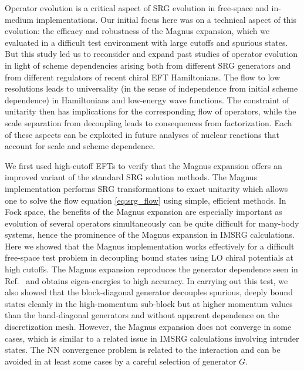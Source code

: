 \documentclass[10pt,aps,prc,floatfix,twocolumn,nofootinbib]{revtex4-1}
\begin{document}
Operator evolution is a critical aspect of SRG evolution in free-space and in-medium implementations.
Our initial focus here was on a technical aspect of this evolution: the efficacy and robustness of the Magnus expansion, which we evaluated in a difficult test environment with large cutoffs and spurious states.
But this study led us to reconsider and expand past studies of operator evolution in light of scheme dependencies arising both from different SRG generators and from different regulators of recent chiral EFT Hamiltonians.
The flow to low resolutions leads to universality (in the sense of independence from initial scheme dependence) in Hamiltonians and low-energy wave functions.
The constraint of unitarity then has implications for the corresponding flow of operators, while the scale separation from decoupling leads to consequences from factorization.
Each of these aspects can be exploited in future analyses of nuclear reactions that account for scale and scheme dependence.


We first used high-cutoff EFTs to verify that the Magnus expansion offers an improved variant of the standard SRG solution methods.
The Magnus implementation performs SRG transformations to exact unitarity which allows one to solve the flow equation \eqref{eq:srg_flow} using simple, efficient methods.
In Fock space, the benefits of the Magnus expansion are especially important as evolution of several operators simultaneously can be quite difficult for many-body systems, hence the prominence of the Magnus expansion in IMSRG calculations.
Here we showed that the Magnus implementation works effectively for a difficult free-space test problem in decoupling bound states using LO chiral potentials at high cutoffs.
The Magnus expansion reproduces the generator dependence seen in Ref.~\cite{Wendt:2011qj} and obtains eigen-energies to high accuracy.
In carrying out this test, we also showed that the block-diagonal generator decouples spurious, deeply bound states cleanly in the high-momentum sub-block but at higher momentum values than the band-diagonal generators and without apparent dependence on the discretization mesh.
However, the Magnus expansion does not converge in some cases, which is similar to a related issue in IMSRG calculations involving intruder states.
The NN convergence problem is related to the interaction and can be avoided in at least some cases by a careful selection of generator $G$.
\end{document}
